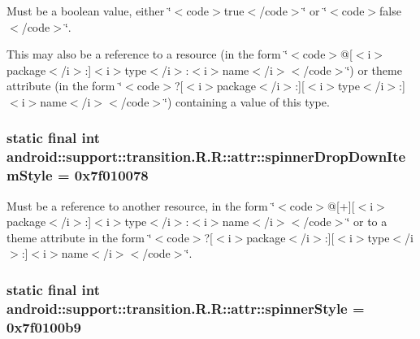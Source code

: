Must be a boolean value, either \char`\"{}$<$code$>$true$<$/code$>$\char`\"{} or \char`\"{}$<$code$>$false$<$/code$>$\char`\"{}. 

This may also be a reference to a resource (in the form \char`\"{}$<$code$>$@\mbox{[}$<$i$>$package$<$/i$>$:\mbox{]}$<$i$>$type$<$/i$>$:$<$i$>$name$<$/i$>$$<$/code$>$\char`\"{}) or theme attribute (in the form \char`\"{}$<$code$>$?\mbox{[}$<$i$>$package$<$/i$>$:\mbox{]}\mbox{[}$<$i$>$type$<$/i$>$:\mbox{]}$<$i$>$name$<$/i$>$$<$/code$>$\char`\"{}) containing a value of this type. \hypertarget{classandroid_1_1support_1_1transition_1_1_r_1_1attr_3719885efdee999faa85001000097da3}{
\subsubsection[{spinnerDropDownItemStyle}]{\setlength{\rightskip}{0pt plus 5cm}static final int android::support::transition.R.R::attr::spinnerDropDownItemStyle = 0x7f010078}}
\label{classandroid_1_1support_1_1transition_1_1_r_1_1attr_3719885efdee999faa85001000097da3}


Must be a reference to another resource, in the form \char`\"{}$<$code$>$@\mbox{[}+\mbox{]}\mbox{[}$<$i$>$package$<$/i$>$:\mbox{]}$<$i$>$type$<$/i$>$:$<$i$>$name$<$/i$>$$<$/code$>$\char`\"{} or to a theme attribute in the form \char`\"{}$<$code$>$?\mbox{[}$<$i$>$package$<$/i$>$:\mbox{]}\mbox{[}$<$i$>$type$<$/i$>$:\mbox{]}$<$i$>$name$<$/i$>$$<$/code$>$\char`\"{}. \hypertarget{classandroid_1_1support_1_1transition_1_1_r_1_1attr_1f34f9cdff90b0f5572649318645194b}{
\subsubsection[{spinnerStyle}]{\setlength{\rightskip}{0pt plus 5cm}static final int android::support::transition.R.R::attr::spinnerStyle = 0x7f0100b9}}
\label{classandroid_1_1support_1_1transition_1_1_r_1_1attr_1f34f9cdff90b0f5572649318645194b}



